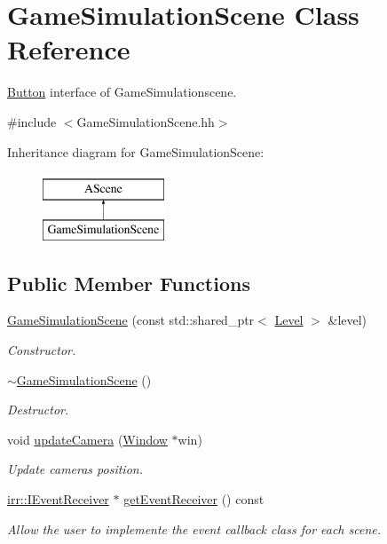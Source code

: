 \hypertarget{classGameSimulationScene}{}\section{Game\+Simulation\+Scene Class Reference}
\label{classGameSimulationScene}


\hyperlink{classButton}{Button} interface of Game\+Simulationscene.  




{\ttfamily \#include $<$Game\+Simulation\+Scene.\+hh$>$}

Inheritance diagram for Game\+Simulation\+Scene\+:\begin{figure}[H]
\begin{center}
\leavevmode
\includegraphics[height=2.000000cm]{classGameSimulationScene}
\end{center}
\end{figure}
\subsection*{Public Member Functions}
\begin{DoxyCompactItemize}
\item 
\hyperlink{classGameSimulationScene_a6983b2c511d45278121bcf62151fbb19}{Game\+Simulation\+Scene} (const std\+::shared\+\_\+ptr$<$ \hyperlink{classLevel}{Level} $>$ \&level)
\begin{DoxyCompactList}\small\item\em Constructor. \end{DoxyCompactList}\item 
\hyperlink{classGameSimulationScene_af45f3e7f70376e59a6f320f21ce2897b}{$\sim$\+Game\+Simulation\+Scene} ()
\begin{DoxyCompactList}\small\item\em Destructor. \end{DoxyCompactList}\item 
void \hyperlink{classGameSimulationScene_a66b107f708b5eed87a3c0a0016541d29}{update\+Camera} (\hyperlink{classWindow}{Window} $\ast$win)
\begin{DoxyCompactList}\small\item\em Update camera\textquotesingle{}s position. \end{DoxyCompactList}\item 
\hyperlink{classirr_1_1IEventReceiver}{irr\+::\+I\+Event\+Receiver} $\ast$ \hyperlink{classGameSimulationScene_a048b2a937caff3af7b4d54f8bd404ec1}{get\+Event\+Receiver} () const
\begin{DoxyCompactList}\small\item\em Allow the user to implemente the event callback class for each scene. \end{DoxyCompactList}\end{DoxyCompactItemize}


